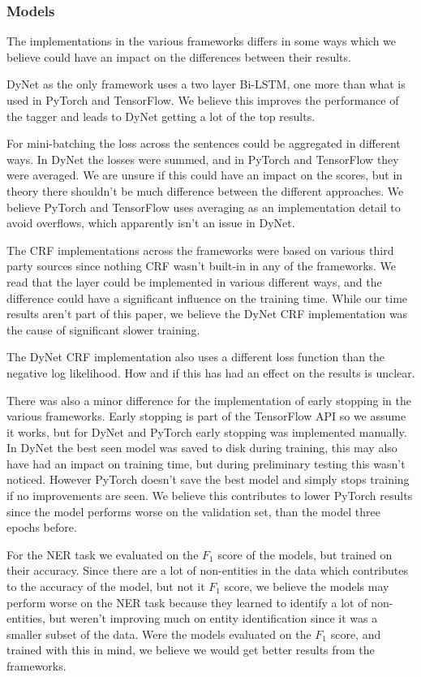 \subsubsection{Models}\label{sec:discuss_models}

The implementations in the various frameworks differs in some ways which we
believe could have an impact on the differences between their results. 

DyNet as the only framework uses a two layer Bi-LSTM, one more than what is used
in PyTorch and TensorFlow. We believe this improves the performance of the
tagger and leads to DyNet getting a lot of the top results. 

For mini-batching the loss across the sentences could be aggregated in different
ways. In DyNet the losses were summed, and in PyTorch and TensorFlow they were
averaged. We are unsure if this could have an impact on the scores, but in
theory there shouldn't be much difference between the different approaches. We
believe PyTorch and TensorFlow uses averaging as an implementation detail to
avoid overflows, which apparently isn't an issue in DyNet.

The CRF implementations across the frameworks were based on various third party
sources since nothing CRF wasn't built-in in any of the frameworks. We read that
the layer could be implemented in various different ways, and the difference
could have a significant influence on the training time. While our time results
aren't part of this paper, we believe the DyNet CRF implementation was the cause
of significant slower training. 

The DyNet CRF implementation also uses a different loss function than the
negative log likelihood. How and if this has had an effect on the results is
unclear.

There was also a minor difference for the implementation of early stopping in
the various frameworks. Early stopping is part of the TensorFlow API so we
assume it works, but for DyNet and PyTorch early stopping was implemented
manually. In DyNet the best seen model was saved to disk during training, this
may also have had an impact on training time, but during preliminary testing
this wasn't noticed. However PyTorch doesn't save the best model and simply
stops training if no improvements are seen. We believe this contributes to lower
PyTorch results since the model performs worse on the validation set, than the
model three epochs before. 

For the NER task we evaluated on the $F_1$ score of the models, but trained on
their accuracy. Since there are a lot of non-entities in the data which
contributes to the accuracy of the model, but not it $F_1$ score, we believe the
models may perform worse on the NER task because they learned to identify a lot
of non-entities, but weren't improving much on entity identification since it
was a smaller subset of the data. Were the models evaluated on the $F_1$ score,
and trained with this in mind, we believe we would get better results from the
frameworks. 

